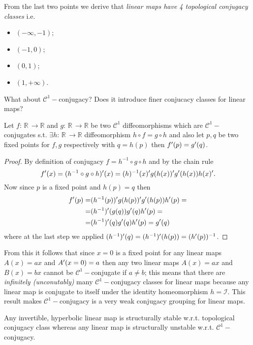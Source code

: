 \documentclass[../main.tex]{subfiles}
\begin{document}
From the last two points we derive that \textit{linear maps have 4 topological conjugacy classes} i.e.
\begin{itemize}
     \item $(-\infty, -1)$;
     \item $(-1, 0)$;
     \item $(0, 1)$;
     \item $(1, +\infty)$.
\end{itemize}
What about $\mathcal{C^{1}}-$conjugacy? Does it introduce finer conjucacy classes for linear maps?
\begin{proposition*}
     Let $f:\,\mathbb{R}\,\to \mathbb{R}$ and $g:\,\mathbb{R}\,\to \mathbb{R}$ be two $\mathcal{C}^{1}$ diffeomorphisms which are $\mathcal{C}^{1}-$conjugates s.t. $\exists h:\,\mathbb{R}\,\to \mathbb{R}$ diffeomorphism $h \circ f = g \circ h$ and also let $p,q$ be two fixed points for $f,g$ respectively with $q=h(p)$ then $f'(p)=g'(q)$.
\end{proposition*}
\begin{proof}
     By definition of conjugacy $f = h^{-1} \circ g \circ h$ and by the chain rule
     \begin{equation*}
             f'(x) = (h^{-1} \circ g \circ h)'(x)= (h)^{-1}(x)'g(h(x))' g'(h(x))h(x)'.
     \end{equation*}
     Now since $p$ is a fixed point and $h(p)=q$ then
    \begin{align*}
            f'(p)=&(h^{-1}(p))'g(h(p))'g'(h(p))h'(p)
 = \nonumber \\
            =& (h^{-1})'(g(q))g'(q)h'(p) = \nonumber \\  
    =& (h^{-1})'(q)g'(q)h'(p)=g'(q)
    \end{align*}
     where at the last step we applied $(h^{-1})'(q)=(h^{-1})'(h(p))=(h'(p))^{-1}$.
\end{proof}
From this it follows that since $x=0$ is a fixed point for any linear maps $A(x)=ax$ and $A'(x=0)=a$ then any two linear maps $A(x)=ax$ and $B(x)=bx$ cannot be $\mathcal{C}^{1}-$conjugate if $a\neq b$; this means that there are \textit{infinitely (unconutably)} many $\mathcal{C}^{1}-$conjugacy classes for linear maps because any linear map is conjugate to itself under the identity homeomorphism $h=\mathcal{I}$. This result makes $\mathcal{C}^{1}-$conjugacy is a very weak conjugacy grouping for linear maps.
\begin{observation}\label{obs9}
     Any invertible, hyperbolic linear map is structurally stable w.r.t. topological conjugacy class whereas any linear map is structurally unstable w.r.t. $\mathcal{C}^{1}-$conjugacy.
\end{observation}
\end{document}
